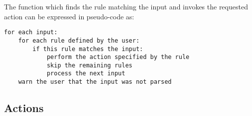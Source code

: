 \documentclass{svmult}
\begin{document}
The function which finds the rule matching the input and invokes the
requested action can be expressed in pseudo-code as:


\begin{verbatim}
for each input:
    for each rule defined by the user: 
        if this rule matches the input:
            perform the action specified by the rule
            skip the remaining rules
            process the next input
    warn the user that the input was not parsed
\end{verbatim}

\subsection{Actions}

\label{Actions}
\end{document}
